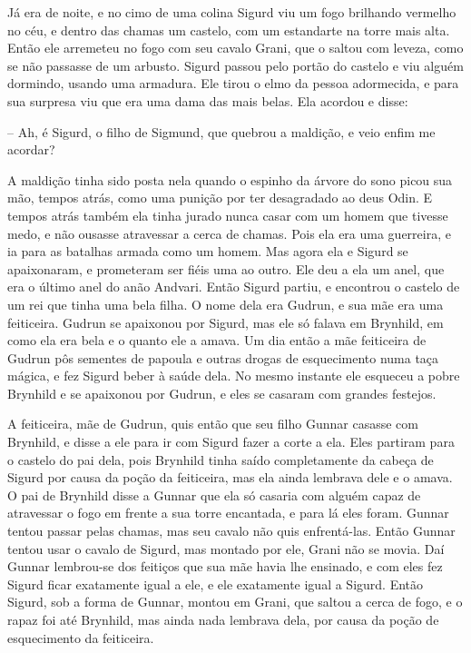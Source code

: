 Já era de noite, e no cimo de uma colina Sigurd viu um fogo brilhando
vermelho no céu, e dentro das chamas um castelo, com um estandarte na
torre mais alta. Então ele arremeteu no fogo com seu cavalo Grani,
que o saltou com leveza, como se não passasse de um arbusto. Sigurd
passou pelo portão do castelo e viu alguém dormindo, usando uma
armadura. Ele tirou o elmo da pessoa adormecida, e para sua surpresa
viu que era uma dama das mais belas. Ela acordou e disse:

-- Ah, é Sigurd, o filho de Sigmund, que quebrou a maldição, e veio
enfim me acordar?

A maldição tinha sido posta nela quando o espinho da árvore do sono
picou sua mão, tempos atrás, como uma punição por ter desagradado ao
deus Odin. E tempos atrás também ela tinha jurado nunca casar com um
homem que tivesse medo, e não ousasse atravessar a cerca de chamas.
Pois ela era uma guerreira, e ia para as batalhas armada como um
homem. Mas agora ela e Sigurd se apaixonaram, e prometeram ser fiéis
uma ao outro. Ele deu a ela um anel, que era o último anel do anão
Andvari. Então Sigurd partiu, e encontrou o castelo de um rei que
tinha uma bela filha. O nome dela era Gudrun, e sua mãe era uma
feiticeira. Gudrun se apaixonou por Sigurd, mas ele só falava em
Brynhild, em como ela era bela e o quanto ele a amava. Um dia então a
mãe feiticeira de Gudrun pôs sementes de papoula e outras drogas de
esquecimento numa taça mágica, e fez Sigurd beber à saúde dela. No
mesmo instante ele esqueceu a pobre Brynhild e se apaixonou por
Gudrun, e eles se casaram com grandes festejos.

A feiticeira, mãe de Gudrun, quis então que seu filho Gunnar casasse
com Brynhild, e disse a ele para ir com Sigurd fazer a corte a ela.
Eles partiram para o castelo do pai dela, pois Brynhild tinha saído
completamente da cabeça de Sigurd por causa da poção da feiticeira,
mas ela ainda lembrava dele e o amava. O pai de Brynhild disse a
Gunnar que ela só casaria com alguém capaz de atravessar o fogo em
frente a sua torre encantada, e para lá eles foram. Gunnar tentou
passar pelas chamas, mas seu cavalo não quis enfrentá-las. Então
Gunnar tentou usar o cavalo de Sigurd, mas montado por ele, Grani não
se movia. Daí Gunnar lembrou-se dos feitiços que sua mãe havia lhe
ensinado, e com eles fez Sigurd ficar exatamente igual a ele, e ele
exatamente igual a Sigurd. Então Sigurd, sob a forma de Gunnar,
montou em Grani, que saltou a cerca de fogo, e o rapaz foi até
Brynhild, mas ainda nada lembrava dela, por causa da poção de
esquecimento da feiticeira.

